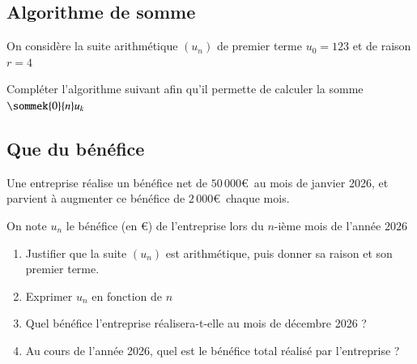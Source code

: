 \documentclass[oneside,12pt]{article}          %
\begin{document}
\subsection{Algorithme de somme}
On considère la suite arithmétique $(u_n)$ de premier terme $u_0 = 123$ et de raison $r = 4$

Compléter l'algorithme suivant afin qu'il permette de calculer la somme $\sommek{0}{n} u_k$
\begin{center}
	\renewcommand{\arraystretch}{1.25}
\end{center}




\subsection{Que du bénéfice}
Une entreprise réalise un bénéfice net de $50\,000$\euro\, au mois de janvier 2026, et parvient à augmenter ce bénéfice de $2\,000$\euro\, chaque mois.

On note $u_n$ le bénéfice (en \euro) de l'entreprise lors du $n$-ième mois de l'année $2026$
\begin{enumerate}
	\item Justifier que la suite $(u_n)$ est arithmétique, puis donner sa raison et son premier terme.
	\item Exprimer $u_n$ en fonction de $n$
	\item Quel bénéfice l'entreprise réalisera-t-elle au mois de décembre 2026 ?
	\item Au cours de l'année 2026, quel est le bénéfice total réalisé par l'entreprise ?
\end{enumerate}
\end{document}
